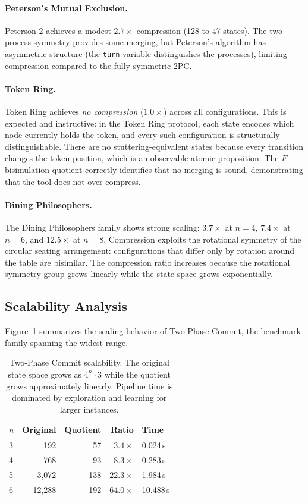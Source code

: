 \documentclass[11pt]{article}
\begin{document}
\paragraph{Peterson's Mutual Exclusion.}
Peterson-2 achieves a modest $2.7\times$ compression (128 to 47 states).
The two-process symmetry provides some merging, but Peterson's algorithm
has asymmetric structure (the \texttt{turn} variable distinguishes the
processes), limiting compression compared to the fully symmetric 2PC.

\paragraph{Token Ring.}
Token Ring achieves \emph{no compression} ($1.0\times$) across all
configurations.
This is expected and instructive: in the Token Ring protocol, each state
encodes which node currently holds the token, and every such configuration
is structurally distinguishable.
There are no stuttering-equivalent states because every transition
changes the token position, which is an observable atomic proposition.
The $F$-bisimulation quotient correctly identifies that no merging is
sound, demonstrating that the tool does not over-compress.

\paragraph{Dining Philosophers.}
The Dining Philosophers family shows strong scaling: $3.7\times$ at
$n = 4$, $7.4\times$ at $n = 6$, and $12.5\times$ at $n = 8$.
Compression exploits the rotational symmetry of the circular seating
arrangement: configurations that differ only by rotation around the table
are bisimilar.
The compression ratio increases because the rotational symmetry group
grows linearly while the state space grows exponentially.

\subsection{Scalability Analysis}

Figure~\ref{fig:scaling} summarizes the scaling behavior of Two-Phase
Commit, the benchmark family spanning the widest range.

\begin{table}[t]
\centering
\caption{Two-Phase Commit scalability.
  The original state space grows as $4^n \cdot 3$ while the quotient grows
  approximately linearly.
  Pipeline time is dominated by exploration and learning for larger instances.}
\label{fig:scaling}
\small
\begin{tabular}{@{}lrrrl@{}}
\toprule
$n$ & \textbf{Original} & \textbf{Quotient} & \textbf{Ratio} &
  \textbf{Time} \\
\midrule
3 &      192 &    57 &  $3.4\times$  & 0.024\,s \\
4 &      768 &    93 &  $8.3\times$  & 0.283\,s \\
5 &    3{,}072 &   138 & $22.3\times$ & 1.984\,s \\
6 &   12{,}288 &   192 & $64.0\times$ & 10.488\,s \\
\bottomrule
\end{tabular}
\end{table}
\end{document}

